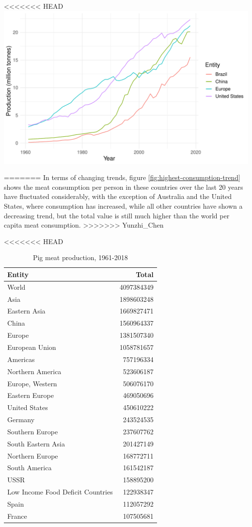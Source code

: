 \documentclass[11pt,a4paper,]{article}
\begin{document}
<<<<<<< HEAD
\includegraphics{report_files/figure-latex/poultry-1.pdf}

\begin{table}
=======
In terms of changing trends, figure \ref{fig:highest-consumption-trend} shows the meat consumption per person in these countries over the last 20 years have fluctuated considerably, with the exception of Australia and the United States, where consumption has increased, while all other countries have shown a decreasing trend, but the total value is still much higher than the world per capita meat consumption.
>>>>>>> Yunzhi_Chen

\caption{\label{tab:pig}Pig meat production, 1961-2018}
\centering
<<<<<<< HEAD
\begin{tabular}[t]{lr}
\toprule
Entity & Total\\
\midrule
World & 4097384349\\
Asia & 1898603248\\
Eastern Asia & 1669827471\\
China & 1560964337\\
Europe & 1381507340\\
\addlinespace
European Union & 1058781657\\
Americas & 757196334\\
Northern America & 523606187\\
Europe, Western & 506076170\\
Eastern Europe & 469050696\\
\addlinespace
United States & 450610222\\
Germany & 243524535\\
Southern Europe & 237607762\\
South Eastern Asia & 201427149\\
Northern Europe & 168772711\\
\addlinespace
South America & 161542187\\
USSR & 158895200\\
Low Income Food Deficit Countries & 122938347\\
Spain & 112057292\\
France & 107505681\\
\bottomrule
\end{tabular}
\end{table}
\end{document}
